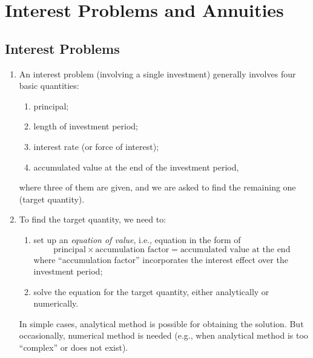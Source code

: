 \section{Interest Problems and Annuities}
\label{sect:int-prob-annuities}
\subsection{Interest Problems}
\begin{enumerate}
\item An interest problem (involving a single investment) generally involves
four basic quantities:
\begin{enumerate}
\item principal;
\item length of investment period;
\item interest rate (or force of interest);
\item accumulated value at the end of the investment period,
\end{enumerate}
where three of them are given, and we are asked to find the remaining one
(target quantity).

\item To find the target quantity, we need to:
\begin{enumerate}
\item set up an \emph{equation of
value}, i.e., equation in the form of
\[
\text{principal}\times\text{accumulation factor}=\text{accumulated value at the end}
\]
where ``accumulation factor'' incorporates the interest effect over the
investment period;
\item solve the equation for the target quantity, either analytically or
numerically.
\end{enumerate}
In simple cases, analytical method is possible for obtaining the solution. But
occasionally, numerical method is needed (e.g., when analytical method is too
``complex'' or does not exist).


\end{enumerate}
